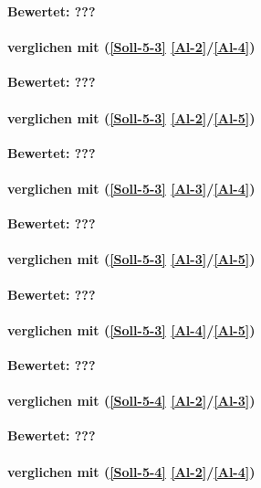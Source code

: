\textbf{Bewertet: ???}

\paragraph*{  verglichen mit  (\ref{Soll-5-3} \ref{Al-2}/\ref{Al-4})}

\textbf{Bewertet: ???}

\paragraph*{  verglichen mit  (\ref{Soll-5-3} \ref{Al-2}/\ref{Al-5})}

\textbf{Bewertet: ???}

\paragraph*{  verglichen mit  (\ref{Soll-5-3} \ref{Al-3}/\ref{Al-4})}

\textbf{Bewertet: ???}

\paragraph*{  verglichen mit  (\ref{Soll-5-3} \ref{Al-3}/\ref{Al-5})}

\textbf{Bewertet: ???}


\paragraph*{  verglichen mit  (\ref{Soll-5-3} \ref{Al-4}/\ref{Al-5})}

\textbf{Bewertet: ???}

\paragraph*{  verglichen mit  (\ref{Soll-5-4} \ref{Al-2}/\ref{Al-3})}

\textbf{Bewertet: ???}

\paragraph*{  verglichen mit  (\ref{Soll-5-4} \ref{Al-2}/\ref{Al-4})}

